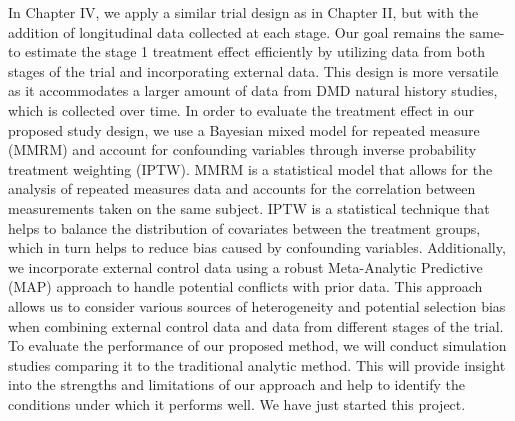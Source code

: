 In Chapter IV, we apply a similar trial design as in Chapter II, but with the addition of longitudinal data collected at each stage. Our goal remains the same- to estimate the stage 1 treatment effect efficiently by utilizing data from both stages of the trial and incorporating external data. This design is more versatile as it accommodates a larger amount of data from DMD natural history studies, which is collected over time. In order to evaluate the treatment effect in our proposed study design, we use a Bayesian mixed model for repeated measure (MMRM) and account for confounding variables through inverse probability treatment weighting (IPTW). MMRM is a statistical model that allows for the analysis of repeated measures data and accounts for the correlation between measurements taken on the same subject. IPTW is a statistical technique that helps to balance the distribution of covariates between the treatment groups, which in turn helps to reduce bias caused by confounding variables. Additionally, we incorporate external control data using a robust Meta-Analytic Predictive (MAP) approach to handle potential conflicts with prior data. This approach allows us to consider various sources of heterogeneity and potential selection bias when combining external control data and data from different stages of the trial. To evaluate the performance of our proposed method, we will conduct simulation studies comparing it to the traditional analytic method. This will provide insight into the strengths and limitations of our approach and help to identify the conditions under which it performs well. We have just started this project.
